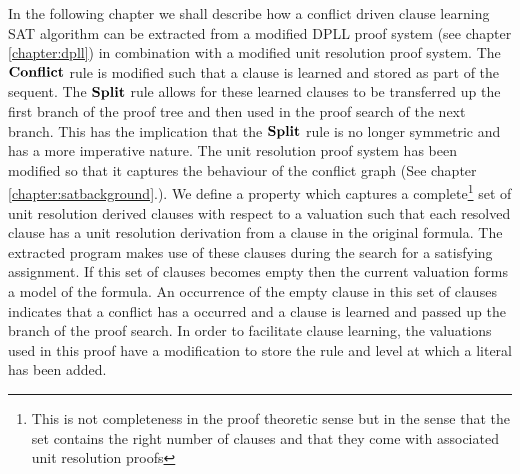 \newcommand{\lit}[1]{\mathrm{Lit}(#1)}
\newcommand{\first}[1]{\mathrm{First}(#1)}
\newcommand{\second}[1]{\mathrm{Second}(#1)}
\newcommand{\extends}[2]{\mathrm{extends(#1,#2)}}
\newcommand{\UnitSub}{\dpllrule{UnitSub}}
\newcommand{\SplitSub}{\dpllrule{SplitSub}}
\newcommand{\complete}[3]{\mathrm{complete}(#1;#2; #3)}
\newcommand{\DeltaVec}{\overrightarrow{\Delta}}
\newcommand{\unitdec}[2]{(U \, #1 \, #2)}
\newcommand{\unitdecg}[1]{\unitdec{#1}{\delta(\Gamma)}}
\newcommand{\unitdecgone}[1]{\unitdec{#1}{\delta(\Gamma) + 1}}
\newcommand{\splitdec}[2]{(S \, #1 \, #2)}
\newcommand{\splitdecg}[1]{\splitdec{#1}{\delta(\Gamma)}}
\newcommand{\splitdecgone}[1]{\splitdec{#1}{\delta(\Gamma) + 1}}
\newcommand{\clmodres}[2]{\overset{#1;#2}{\underset{URes}{\vdash}}}


 \label{chapter:cdclproof}
In the following chapter we shall describe how a conflict driven clause learning SAT algorithm can be extracted from a modified DPLL proof system (see chapter \ref{chapter:dpll}) in combination with a modified unit resolution proof system. The $\mathbf{Conflict}$ rule is modified such that a clause is learned and stored as part of the sequent. The $\mathbf{Split}$ rule allows for these learned clauses to be transferred up the first branch of the proof tree and then used in the proof search of the next branch. This has the implication that the $\mathbf{Split}$ rule is no longer symmetric and has a more imperative nature. The unit resolution proof system has been modified so that it captures the behaviour  of the conflict graph (See chapter \ref{chapter:satbackground}.). We define a property which captures a complete\footnote{This is not completeness in the proof theoretic sense but in the sense that the set contains the right number of clauses  and that they come with associated unit resolution proofs} set of unit resolution derived clauses with respect to a valuation such that each resolved clause has a unit resolution derivation from a clause in the original formula. The extracted program makes use of these clauses during the search for a satisfying assignment. If this set of clauses becomes empty then the current valuation forms a model of the formula. An occurrence of the empty clause in this set of clauses indicates that a conflict has a occurred and a clause is learned and passed up the branch of the proof search. In order to facilitate clause learning, the valuations used in this proof have a modification to store the rule and level at which a literal has been added. 


